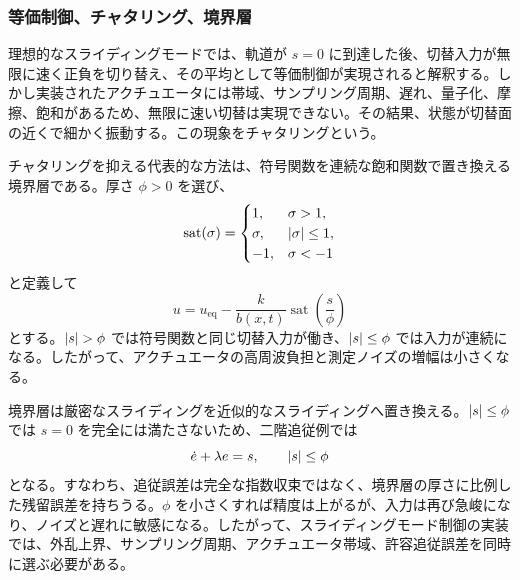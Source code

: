 \subsubsection{等価制御、チャタリング、境界層}

理想的なスライディングモードでは、軌道が $s=0$ に到達した後、切替入力が無限に速く正負を切り替え、その平均として等価制御が実現されると解釈する。しかし実装されたアクチュエータには帯域、サンプリング周期、遅れ、量子化、摩擦、飽和があるため、無限に速い切替は実現できない。その結果、状態が切替面の近くで細かく振動する。この現象をチャタリングという。

チャタリングを抑える代表的な方法は、符号関数を連続な飽和関数で置き換える境界層である。厚さ $\phi>0$ を選び、
\begin{equation}
  \operatorname{sat}(\sigma)=
  \begin{cases}
    1,&\sigma>1,\\
    \sigma,&\left|\sigma\right|\le1,\\
    -1,&\sigma<-1
  \end{cases}
\end{equation}
と定義して
\begin{equation}
  u=u_\mathrm{eq}-\frac{k}{b(x,t)}
    \operatorname{sat}\left(\frac{s}{\phi}\right)
\end{equation}
とする。$\abs{s}>\phi$ では符号関数と同じ切替入力が働き、$\left|s\right|\le\phi$ では入力が連続になる。したがって、アクチュエータの高周波負担と測定ノイズの増幅は小さくなる。

境界層は厳密なスライディングを近似的なスライディングへ置き換える。$\left|s\right|\le\phi$ では $s=0$ を完全には満たさないため、二階追従例では
\begin{equation}
  \dot{e}+\lambda e=s,\qquad \left|s\right|\le\phi
\end{equation}
となる。すなわち、追従誤差は完全な指数収束ではなく、境界層の厚さに比例した残留誤差を持ちうる。$\phi$ を小さくすれば精度は上がるが、入力は再び急峻になり、ノイズと遅れに敏感になる。したがって、スライディングモード制御の実装では、外乱上界、サンプリング周期、アクチュエータ帯域、許容追従誤差を同時に選ぶ必要がある。

